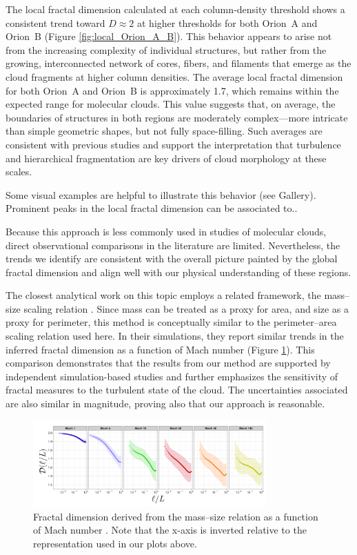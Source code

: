 The local fractal dimension calculated at each column‑density threshold shows a consistent trend toward \(D \approx 2\) at higher thresholds for both Orion~A and Orion~B (Figure \ref{fig:local_Orion_A_B}).  
This behavior appears to arise not from the increasing complexity of individual structures, but rather from the growing, interconnected network of cores, fibers, and filaments that emerge as the cloud fragments at higher column densities.
The average local fractal dimension for both Orion~A and Orion~B is approximately 1.7, which remains within the expected range for molecular clouds. This value suggests that, on average, the boundaries of structures in both regions are moderately complex—more intricate than simple geometric shapes, but not fully space-filling. Such averages are consistent with previous studies and support the interpretation that turbulence and hierarchical fragmentation are key drivers of cloud morphology at these scales.

Some visual examples are helpful to illustrate this behavior (see Gallery).  
Prominent peaks in the local fractal dimension can be associated to..

Because this approach is less commonly used in studies of molecular clouds, direct observational comparisons in the literature are limited.  
Nevertheless, the trends we identify are consistent with the overall picture painted by the global fractal dimension and align well with our physical understanding of these regions.

The closest analytical work on this topic employs a related framework, the mass–size scaling relation \cite{beattie2019relation}.  
Since mass can be treated as a proxy for area, and size as a proxy for perimeter, this method is conceptually similar to the perimeter–area scaling relation used here.  
In their simulations, they report similar trends in the inferred fractal dimension as a function of Mach number (Figure \ref{fig:beattie_fractal_dimension}).
This comparison demonstrates that the results from our method are supported by independent simulation-based studies and further emphasizes the sensitivity of fractal measures to the turbulent state of the cloud. The uncertainties associated are also similar in magnitude, proving also that our approach is reasonable.

\begin{figure}[t]
    \centering
    \includegraphics[width=0.8\textwidth]{figures/beattie_fractal_dimension.png}
    \caption{Fractal dimension derived from the mass–size relation as a function of Mach number \cite{beattie2019relation}.  
    Note that the x-axis is inverted relative to the representation used in our plots above.}
    \label{fig:beattie_fractal_dimension}
\end{figure}

